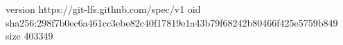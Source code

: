 version https://git-lfs.github.com/spec/v1
oid sha256:298f7b0ec6a461cc3ebe82c40f17819e1a43b79f68242b80466f425e5759b849
size 403349
